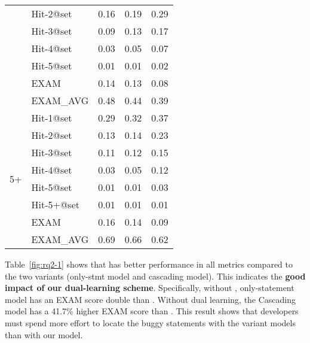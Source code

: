 \begin{table}[b]
{\begin{center}
\begin{tabular}{p{1cm}<{\centering}|p{1.5cm}<{\centering}|p{1.5cm}<{\centering}|p{1.5cm}<{\centering}|p{1.2cm}<{\centering}}
									& Hit-2@set     & 0.16 & 0.19 & 0.29 \\
									& Hit-3@set     & 0.09 & 0.13 & 0.17 \\
									& Hit-4@set     & 0.03 & 0.05 & 0.07 \\
									& Hit-5@set     & 0.01 & 0.01 & 0.02 \\
									& EXAM          & 0.14 & 0.13 & 0.08 \\
									& EXAM\_AVG     & 0.48 & 0.44 & 0.39 \\
				\hline
				\multirow{8}{*}{5+}  & Hit-1@set     & 0.29 & 0.32 & 0.37 \\
									& Hit-2@set     & 0.13 & 0.14 & 0.23 \\
									& Hit-3@set     & 0.11 & 0.12 & 0.15 \\
									& Hit-4@set     & 0.03 & 0.05 & 0.12 \\
									& Hit-5@set     & 0.01 & 0.01 & 0.03 \\
									& Hit-5+@set    & 0.01 & 0.01 & 0.01 \\
									& EXAM          & 0.16 & 0.14 & 0.09 \\
									& EXAM\_AVG     & 0.69 & 0.66 & 0.62 \\
				\hline
			\end{tabular}
			
			\label{fig:rq2}
		\end{center}
	}
\end{table}
\fi

Table~\ref{fig:rq2-1} shows that {\tool} has better performance in all
metrics compared to the two variants (only-stmt model and cascading
model). This indicates the {\bf good impact of our dual-learning
scheme}. Specifically, without , only-statement model has
an EXAM score double than {\tool}. Without dual learning, the
Cascading model has a 41.7\% higher EXAM score than {\tool}. This
result shows that developers must spend more effort to locate the
buggy statements with the variant models than with our model.



